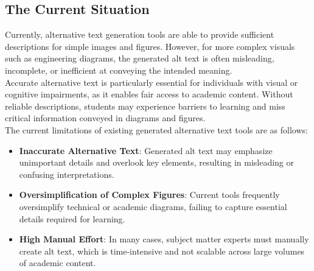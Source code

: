 \documentclass[12pt]{article}
\begin{document}
\subsection{The Current Situation}
Currently, alternative text generation tools are able to provide sufficient descriptions for simple images and figures. However, for more complex visuals 
such as engineering diagrams, the generated alt text is often misleading, incomplete, or inefficient at conveying the intended meaning.\\
Accurate alternative text is particularly essential for individuals with visual or cognitive impairments, as it enables fair access to academic content. Without 
reliable descriptions, students may experience barriers to learning and miss critical information conveyed in diagrams and figures.\\
The current limitations of existing generated alternative text tools are as follows:
\begin{itemize}
  \item \textbf{Inaccurate Alternative Text}: Generated alt text may emphasize unimportant details and overlook key elements, 
  resulting in misleading or confusing interpretations.
  \item \textbf{Oversimplification of Complex Figures}: Current tools frequently oversimplify technical or academic diagrams, 
  failing to capture essential details required for learning.
  \item \textbf{High Manual Effort}: In many cases, subject matter experts must manually create alt text, 
  which is time-intensive and not scalable across large volumes of academic content.
\end{itemize}
\end{document}
